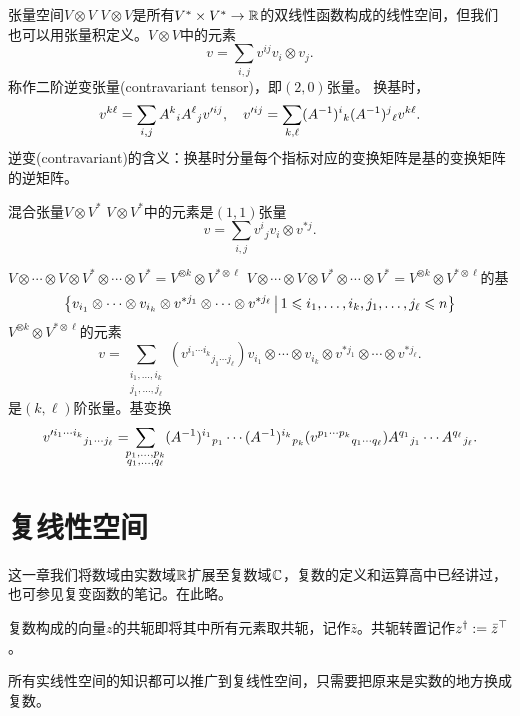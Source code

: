 \begin{example}{张量空间$V\otimes V$}{}
	$V\otimes V$是所有$V^\ast\times V^\ast\to\RR$的双线性函数构成的线性空间，但我们也可以用张量积定义。$V\otimes V$中的元素
	\[
		v=\sum_{i,j}v^{ij}v_i\otimes v_j.
	\]
	称作二阶逆变张量(contravariant tensor)，即$(2,0)$张量。
	\tcblower
	换基时，
	\[
		v^{k\ell}=\sum_{i,j}A^k{}_iA^\ell{}_jv'^{ij},\quad v'^{ij}=\sum_{k,\ell}(A\iv)^i{}_k(A\iv)^j{}_\ell v^{k\ell}.
	\]
	逆变(contravariant)的含义：换基时分量每个指标对应的变换矩阵是基的变换矩阵的逆矩阵。
\end{example}
\begin{example}{混合张量$V\otimes V^\ast$}{}
	$V\otimes V^\ast$中的元素是$(1,1)$张量
	\[
		v=\sum_{i,j}v^i{}_jv_i\otimes v^{\ast j}.
	\]
\end{example}
\begin{example}{$V\otimes\cdots\otimes V\otimes V^\ast\otimes\cdots\otimes V^\ast=V^{\otimes k}\otimes V^{\ast\otimes\ell}$}{}
	$V\otimes\cdots\otimes V\otimes V^\ast\otimes\cdots\otimes V^\ast=V^{\otimes k}\otimes V^{\ast\otimes\ell}$的基 
	\[
		\set{v_{i_1}\otimes\cdots\otimes v_{i_k}\otimes v^{\ast j_1}\otimes\cdots\otimes v^{\ast j_\ell}}{1\leqslant i_1,\ldots,i_k,j_1,\ldots,j_\ell\leqslant n}
	\]
	$V^{\otimes k}\otimes V^{\ast\otimes\ell}$的元素 
	\[
		v=\sum_{\substack{i_1,\ldots,i_k\\j_1,\ldots,j_\ell}}(v^{i_1\cdots i_k}{}_{j_1\cdots j_\ell})v_{i_1}\otimes\cdots\otimes v_{i_k}\otimes v^{\ast j_1}\otimes\cdots\otimes v^{\ast j_\ell}.
	\]
	是$(k,\ell)$阶张量。基变换
	\[
		v'^{i_1\cdots i_k}{}_{j_1\cdots j_\ell}=\bs5\sum_{\substack{p_1,\ldots,p_k\\q_1,\ldots,q_\ell}}(A\iv)^{i_1}{}_{p_1}\cdots(A\iv)^{i_k}{}_{p_k}(v^{p_1\cdots p_k}{}_{q_1\cdots q_\ell})A^{q_1}{}_{j_1}\cdots A^{q_\ell}{}_{j_\ell}.
	\]
\end{example}
\clearpage
\section{复线性空间}
\label{sec:complex linear space}
这一章我们将数域由实数域$\RR$扩展至复数域$\CC$，复数的定义和运算高中已经讲过，也可参见复变函数的笔记。在此略。

复数构成的向量$z$的共轭即将其中所有元素取共轭，记作$\bar z$。共轭转置记作$z\dg:=\bar z\tp$。

所有实线性空间的知识都可以推广到复线性空间，只需要把原来是实数的地方换成复数。
